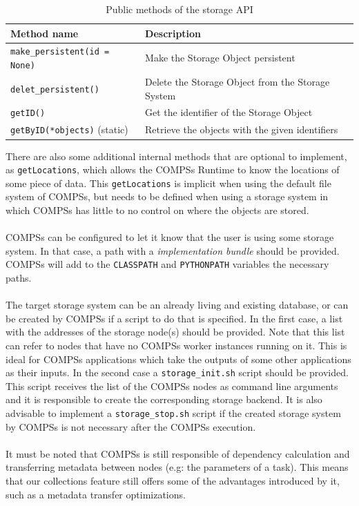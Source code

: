 \begin{table}[]
\centering
\begin{tabular}{|l|l|}
\hline
Method name                                                     & Description                                                        \\ \hline
\verb|make_persistent(id = None)| & Make the Storage Object persistent                                 \\ \hline
\verb|delet_persistent()|        & Delete the Storage Object from the Storage System                  \\ \hline
\verb|getID()|                     & Get the identifier of the Storage Object                           \\ \hline
\verb|getByID(*objects)| (static)  & Retrieve the objects with the given identifiers \\ \hline
\end{tabular}
\caption{Public methods of the storage API}
\label{table:storage_api_public_methods}
\end{table}
There are also some additional internal methods that are optional to implement, as \verb|getLocations|, which allows the COMPSs Runtime to know the locations of some piece of data. This \verb|getLocations| is implicit when using the default file system of COMPSs, but needs to be defined when using a storage system in which COMPSs has little to no control on where the objects are stored.\\
\\
COMPSs can be configured to let it know that the user is using some storage system. In that case, a path with a \textit{implementation bundle} should be provided. COMPSs will add to the \verb|CLASSPATH| and \verb|PYTHONPATH| variables the necessary paths.\\
\\
The target storage system can be an already living and existing database, or can be created by COMPSs if a script to do that is specified. In the first case, a list with the addresses of the storage node(s) should be provided. Note that this list can refer to nodes that have no COMPSs worker instances running on it. This is ideal for COMPSs applications which take the outputs of some other applications as their inputs. In the second case a \verb|storage_init.sh| script should be provided. This script receives the list of the COMPSs nodes as command line arguments and it is responsible to create the corresponding storage backend. It is also advisable to implement a \verb|storage_stop.sh| script if the created storage system by COMPSs is not necessary after the COMPSs execution.\\
\\
It must be noted that COMPSs is still responsible of dependency calculation and  transferring metadata between nodes (e.g: the parameters of a task). This means that our collections feature still offers some of the advantages introduced by it, such as a metadata transfer optimizations.

